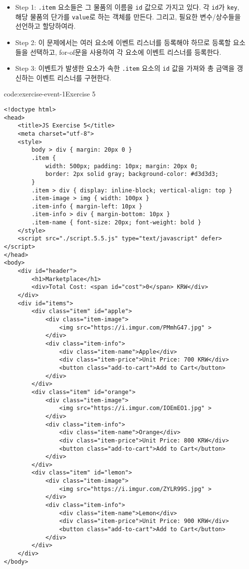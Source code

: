 \begin{itemize}
    \item Step 1: \texttt{.item} 요소들은 그 물품의 이름을 \texttt{id} 값으로 가지고 있다. 각 \texttt{id}가 \texttt{key}, 해당 물품의 단가를 \texttt{value}로 하는 객체를 만든다. 그리고, 필요한 변수/상수들을 선언하고 할당하여라.
    \item Step 2: 이 문제에서는 여러 요소에 이벤트 리스너를 등록해야 하므로 등록할 요소들을 선택하고, for-of문을 사용하여 각 요소에 이벤트 리스너를 등록한다.
    \item Step 3: 이벤트가 발생한 요소가 속한 \texttt{.item} 요소의 \texttt{id} 값을 가져와 총 금액을 갱신하는 이벤트 리스너를 구현한다.
\end{itemize}

\begin{codeenv}{code:exercise-event-1}{Exercise 5}\begin{verbatim}
<!doctype html>
<head>
    <title>JS Exercise 5</title>
    <meta charset="utf-8">
    <style>
        body > div { margin: 20px 0 }
        .item { 
            width: 500px; padding: 10px; margin: 20px 0;
            border: 2px solid gray; background-color: #d3d3d3;
        }
        .item > div { display: inline-block; vertical-align: top }
        .item-image > img { width: 100px }
        .item-info { margin-left: 10px }
        .item-info > div { margin-bottom: 10px }
        .item-name { font-size: 20px; font-weight: bold }
    </style>
    <script src="./script.5.5.js" type="text/javascript" defer></script>
</head>
<body>
    <div id="header">
        <h1>Marketplace</h1>
        <div>Total Cost: <span id="cost">0</span> KRW</div>
    </div>
    <div id="items">
        <div class="item" id="apple">
            <div class="item-image">
                <img src="https://i.imgur.com/PMmhG47.jpg" >
            </div>
            <div class="item-info">
                <div class="item-name">Apple</div>
                <div class="item-price">Unit Price: 700 KRW</div>
                <button class="add-to-cart">Add to Cart</button>
            </div>
        </div>
        <div class="item" id="orange">
            <div class="item-image">
                <img src="https://i.imgur.com/IOEmEO1.jpg" >
            </div>
            <div class="item-info">
                <div class="item-name">Orange</div>
                <div class="item-price">Unit Price: 800 KRW</div>
                <button class="add-to-cart">Add to Cart</button>
            </div>
        </div>
        <div class="item" id="lemon">
            <div class="item-image">
                <img src="https://i.imgur.com/ZYLR99S.jpg" >
            </div>
            <div class="item-info">
                <div class="item-name">Lemon</div>
                <div class="item-price">Unit Price: 900 KRW</div>
                <button class="add-to-cart">Add to Cart</button>
            </div>
        </div>
    </div>
</body>
\end{verbatim}
\end{codeenv}

